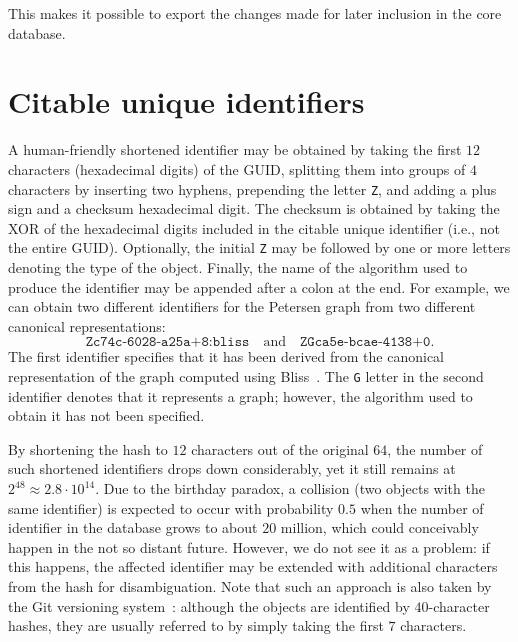 \documentclass[12pt,a4paper]{article}
\begin{document}
This makes it possible to export the changes made
for later inclusion in the core database.

\section{Citable unique identifiers}

A human-friendly shortened identifier may be obtained
by taking the first $12$ characters (hexadecimal digits) of the GUID,
splitting them into groups of $4$ characters by inserting two hyphens,
prepending the letter \texttt{Z},
and adding a plus sign and a checksum hexadecimal digit.
The checksum is obtained by taking the XOR
of the hexadecimal digits included in the citable unique identifier
(i.e., not the entire GUID).
Optionally, the initial \texttt{Z} may be followed by one or more letters
denoting the type of the object.
Finally, the name of the algorithm used to produce the identifier
may be appended after a colon at the end.
For example, we can obtain two different identifiers for the Petersen graph
from two different canonical representations:
\begin{equation}
\texttt{Zc74c-6028-a25a+8:bliss} \quad \text{and} \quad \texttt{ZGca5e-bcae-4138+0}.
\end{equation}
The first identifier specifies that it has been derived
from the canonical representation of the graph
computed using Bliss~\cite{Bliss}.
The \texttt{G} letter in the second identifier
denotes that it represents a graph;
however, the algorithm used to obtain it has not been specified.

By shortening the hash to $12$ characters out of the original $64$,
the number of such shortened identifiers drops down considerably,
yet it still remains at $2^{48} \approx 2.8 \cdot 10^{14}$.
Due to the birthday paradox, a collision
(two objects with the same identifier)
is expected to occur with probability $0.5$
when the number of identifier in the database grows to about $20$ million,
which could conceivably happen in the not so distant future.
However, we do not see it as a problem:
if this happens, the affected identifier may be extended
with additional characters from the hash for disambiguation.
Note that such an approach
is also taken by the Git versioning system~\cite{git}:
although the objects are identified by $40$-character hashes,
they are usually referred to by simply taking the first $7$ characters.



\end{document}
